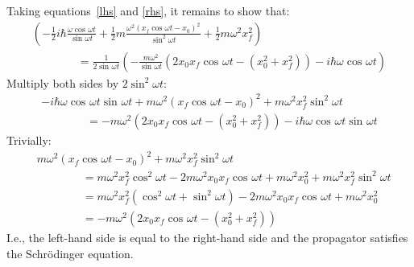 \documentclass[a4paper]{extarticle}
\newcommand{\half}{\frac{1}{2}}
\newcommand{\w}{\omega}
\newcommand{\sinwt}[1][]{\sin^{#1}\omega t}
\newcommand{\coswt}[1][]{\cos^{#1}\omega t}
\begin{document}
\newpage
Taking equations~\ref{lhs} and \ref{rhs}, it remains to show that:
\begin{multline*}
  \left(
  -\half i\hbar \frac{\w\coswt}{\sinwt} +
  \half m \frac{\w^2(x_f \coswt - x_0)^2}{\sinwt[2]} +
  \half m\w ^2 x_f^2
  \right)
  \\[2ex]
  \qquad\qquad =
  \frac{1}{2\sinwt}
  \left(
  -\frac{m\w^2}{\sinwt}\left(2x_0 x_f\coswt - (x_0^2 + x_f^2)\right) -
  i\hbar\w\coswt
  \right)
\end{multline*}
Multiply both sides by $2\sinwt[2]$:
\begin{multline*}
  -i\hbar\w\coswt\sinwt +
  m \w^2(x_f \coswt - x_0)^2 +
  m\w ^2 x_f^2 \sinwt[2]
  \\[2ex]
  \qquad\qquad =
  -m\w^2\left(2x_0 x_f\coswt - (x_0^2 + x_f^2)\right) -
  i\hbar\w\coswt\sinwt
\end{multline*}
Trivially:
\begin{align*}
   & m \w^2(x_f \coswt - x_0)^2 +
  m\w ^2 x_f^2 \sinwt[2]
  \\[2ex]
   & \qquad\qquad =
  m\w^2 x_f^2\coswt[2] - 2m\w^2 x_0 x_f\coswt + m\w^2 x_0^2 +
  m\w ^2 x_f^2 \sinwt[2]
  \\[2ex]
   & \qquad\qquad =
  m\w^2 x_f^2\left(\coswt[2] + \sinwt[2]\right) - 2m\w^2 x_0 x_f\coswt + m\w^2 x_0^2
  \\[2ex]
   & \qquad\qquad =
  - m\w^2 \left(2x_0 x_f\coswt - (x_0^2 + x_f^2)\right)
\end{align*}
I.e., the left-hand side is equal to the right-hand side and the propagator
satisfies the Schr\"{o}dinger equation.
\end{document}
